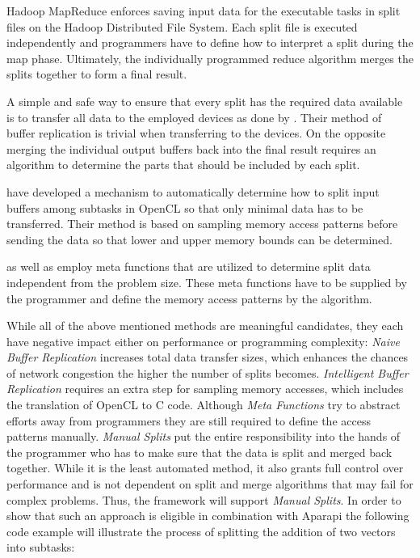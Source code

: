\begin{description}[style=nextline]
	\item [Manual Splits]
	Hadoop MapReduce enforces saving input data for the executable tasks in split files on the Hadoop Distributed File System. Each split file is executed independently and programmers have to define how to interpret a split during the map phase. Ultimately, the individually programmed reduce algorithm merges the splits together to form a final result.
	
	\item [Naive Buffer Replication]
	A simple and safe way to ensure that every split has the required data available is to transfer all data to the employed devices as done by \citeauthor{delalama_2012}\cite{delalama_2012}. Their method of buffer replication is trivial when transferring to the devices. On the opposite merging the individual output buffers back into the final result requires an algorithm to determine the parts that should be included by each split.
	
	\item [Intelligent Buffer Replication]
	\citeauthor{Kim_2011}\cite{Kim_2011} have developed a mechanism to automatically determine how to split input buffers among subtasks in OpenCL so that only minimal data has to be transferred. Their method is based on sampling memory access patterns before sending the data so that lower and upper memory bounds can be determined.
		
	\item [Meta Functions]
	\citeauthor{stepocl}\cite{stepocl} as well as \citeauthor{distcl}\cite{distcl} employ meta functions that are utilized to determine split data independent from the problem size. These meta functions have to be supplied by the programmer and define the memory access patterns by the algorithm.
	
\end{description} 

While all of the above mentioned methods are meaningful candidates, they each have negative impact either on performance or programming complexity: \textit{Naive Buffer Replication} increases total data transfer sizes, which enhances the chances of network congestion the higher the number of splits becomes. \textit{Intelligent Buffer Replication} requires an extra step for sampling memory accesses, which includes the translation of OpenCL to C code. Although \textit{Meta Functions} try to abstract efforts away from programmers they are still required to define the access patterns manually. \textit{Manual Splits} put the entire responsibility into the hands of the programmer who has to make sure that the data is split and merged back together. While it is the least automated method, it also grants full control over performance and is not dependent on split and merge algorithms that may fail for complex problems. Thus, the framework will support \textit{Manual Splits}. In order to show that such an approach is eligible in combination with Aparapi the following code example will illustrate the process of splitting the addition of two vectors into subtasks:

